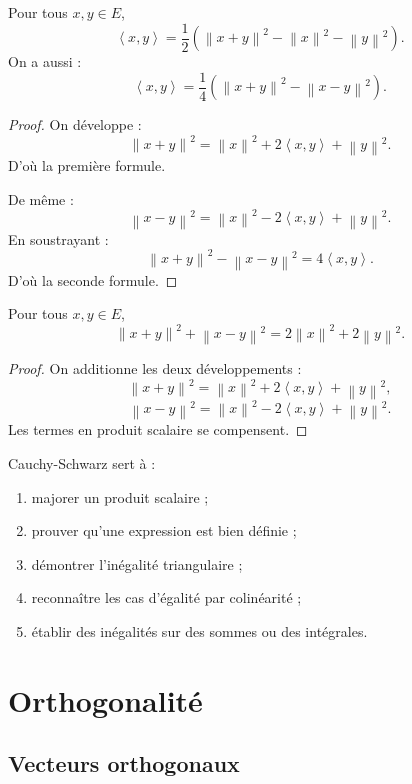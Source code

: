 \documentclass[11pt,a4paper]{article}
\newcommand{\norme}[1]{\left\lVert #1\right\rVert}
\newcommand{\scal}[2]{\left\langle #1,#2\right\rangle}
\begin{document}
\begin{theorembox}
Pour tous \(x,y\in E\),
\[
\scal{x}{y}
=
\frac12\left(\norme{x+y}^2-\norme{x}^2-\norme{y}^2\right).
\]
On a aussi :
\[
\scal{x}{y}
=
\frac14\left(\norme{x+y}^2-\norme{x-y}^2\right).
\]
\end{theorembox}

\begin{proof}
On développe :
\[
\norme{x+y}^2
=
\norme{x}^2+2\scal{x}{y}+\norme{y}^2.
\]
D'où la première formule.

De même :
\[
\norme{x-y}^2
=
\norme{x}^2-2\scal{x}{y}+\norme{y}^2.
\]
En soustrayant :
\[
\norme{x+y}^2-\norme{x-y}^2=4\scal{x}{y}.
\]
D'où la seconde formule.
\end{proof}

\begin{theorembox}
Pour tous \(x,y\in E\),
\[
\norme{x+y}^2+\norme{x-y}^2
=
2\norme{x}^2+2\norme{y}^2.
\]
\end{theorembox}

\begin{proof}
On additionne les deux développements :
\[
\norme{x+y}^2
=
\norme{x}^2+2\scal{x}{y}+\norme{y}^2,
\]
\[
\norme{x-y}^2
=
\norme{x}^2-2\scal{x}{y}+\norme{y}^2.
\]
Les termes en produit scalaire se compensent.
\end{proof}

\begin{methodbox}
Cauchy-Schwarz sert à :
\begin{enumerate}
    \item majorer un produit scalaire ;
    \item prouver qu'une expression est bien définie ;
    \item démontrer l'inégalité triangulaire ;
    \item reconnaître les cas d'égalité par colinéarité ;
    \item établir des inégalités sur des sommes ou des intégrales.
\end{enumerate}
\end{methodbox}

\section{Orthogonalité}

\subsection{Vecteurs orthogonaux}
\end{document}
